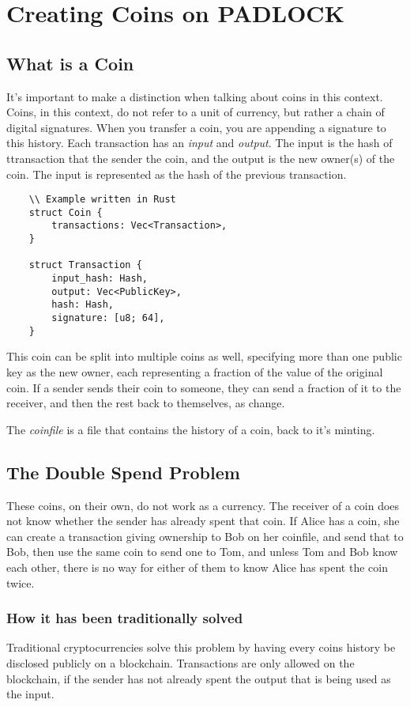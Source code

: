 \documentclass[12pt, letterpaper]{article}
\begin{document}
\section{Creating Coins on PADLOCK}

\subsection{What is a Coin}
It's important to make a distinction when talking about coins in this context.
Coins, in this context, do not refer to a unit of currency, but rather a chain
of digital signatures. When you transfer a coin, you are appending a signature
to this history. Each transaction has an \textit{input} and \textit{output}. The
input is the hash of ttransaction that the sender the coin, and the output is the new
owner(s) of the coin. The input is represented as the hash of the previous
transaction.

\begin{verbatim}
    \\ Example written in Rust
    struct Coin {
        transactions: Vec<Transaction>,
    }
    
    struct Transaction {
        input_hash: Hash,
        output: Vec<PublicKey>,
        hash: Hash,
        signature: [u8; 64],
    }
\end{verbatim}

This coin can be split into multiple coins as well, specifying more than one
public key as the new owner, each representing a fraction of the value of the
original coin. If a sender sends their coin to someone, they can send a fraction
of it to the receiver, and then the rest back to themselves, as change.

The \textit{coinfile} is a file that contains the history of a coin, back to
it's minting.


\subsection{The Double Spend Problem}
These coins, on their own, do not work as a currency. The receiver of a coin
does not know whether the sender has already spent that coin. If Alice has a
coin, she can create a transaction giving ownership to Bob on her coinfile, and
send that to Bob, then use the same coin to send one to Tom, and unless Tom and
Bob know each other, there is no way for either of them to know Alice has spent
the coin twice.

\subsubsection{How it has been traditionally solved}
Traditional cryptocurrencies solve this problem by having every coins history be
disclosed publicly on a blockchain. Transactions are only allowed on the
blockchain, if the sender has not already spent the output that is being used as
the input.
\end{document}
